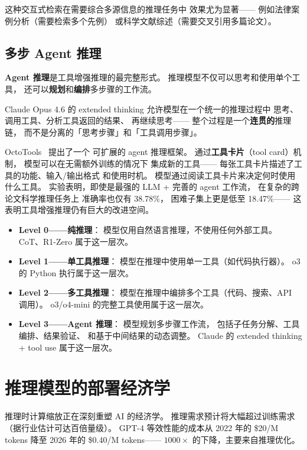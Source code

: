 这种交互式检索在需要综合多源信息的推理任务中
效果尤为显著——
例如法律案例分析（需要检索多个先例）
或科学文献综述（需要交叉引用多篇论文）。

\subsection{多步 Agent 推理}

\textbf{Agent 推理}是工具增强推理的最完整形式。
推理模型不仅可以思考和使用单个工具，
还可以\textbf{规划}和\textbf{编排}多步骤的工作流。

Claude Opus 4.6 的 extended thinking
允许模型在一个统一的推理过程中
思考、调用工具、分析工具返回的结果、
再继续思考——
整个过程是一个\textbf{连贯的}推理链，
而不是分离的「思考步骤」和「工具调用步骤」。

OctoTools~\cite{lu2025octotools} 提出了一个
可扩展的 agent 推理框架。
通过\textbf{工具卡片}（tool card）机制，
模型可以在无需额外训练的情况下
集成新的工具——
每张工具卡片描述了工具的功能、输入/输出格式
和使用时机。
模型通过阅读工具卡片来决定何时使用什么工具。
实验表明，即使是最强的 LLM + 完善的 agent 工作流，
在复杂的跨论文科学推理任务上
准确率也仅有 38.78\%，
困难子集上更是低至 18.47\%——
这表明工具增强推理仍有巨大的改进空间。

\begin{keybox}[工具增强推理的层次]
\begin{itemize}[noitemsep]
  \item \textbf{Level 0——纯推理}：
        模型仅用自然语言推理，不使用任何外部工具。
        CoT、R1-Zero 属于这一层次。
  \item \textbf{Level 1——单工具推理}：
        模型在推理中使用单一工具（如代码执行器）。
        o3 的 Python 执行属于这一层次。
  \item \textbf{Level 2——多工具推理}：
        模型在推理中编排多个工具（代码、搜索、API 调用）。
        o3/o4-mini 的完整工具使用属于这一层次。
  \item \textbf{Level 3——Agent 推理}：
        模型规划多步骤工作流，
        包括子任务分解、工具编排、结果验证、
        和基于中间结果的动态调整。
        Claude 的 extended thinking + tool use 属于这一层次。
\end{itemize}
\end{keybox}


\section{推理模型的部署经济学}

推理时计算缩放正在深刻重塑 AI 的经济学。
推理需求预计将大幅超过训练需求（据行业估计可达百倍量级）。
GPT-4 等效性能的成本从 2022 年的 \$20/M tokens
降至 2026 年的 \$0.40/M tokens——
$1000\times$ 的下降，主要来自推理优化。

